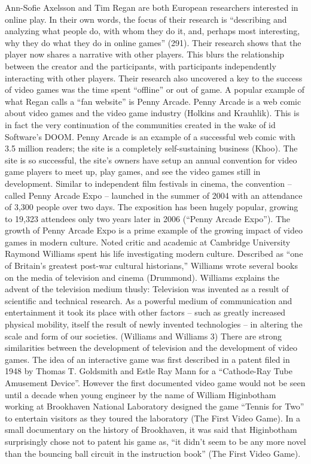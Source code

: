 Ann-Sofie Axelsson and Tim Regan are both European researchers interested in online play. In their own words, the focus of their research is “describing and analyzing what people do, with whom they do it, and, perhaps most interesting, why they do what they do in online games” (291).  Their research shows that the player now shares a narrative with other players. This blurs the relationship between the creator and the participants, with participants independently interacting with other players. Their research also uncovered a key to the success of video games was the time spent “offline” or out of game.  A popular example of what Regan calls a “fan website” is Penny Arcade. 
Penny Arcade is a web comic about video games and the video game industry (Holkins and Krauhlik). This is in fact the very continuation of the communities created in the wake of id Software’s DOOM. Penny Arcade is an example of a successful web comic with 3.5 million readers; the site is a completely self-sustaining business (Khoo). The site is so successful, the site’s owners have setup an annual convention for video game players to meet up, play games, and see the video games still in development. Similar to independent film festivals in cinema, the convention – called Penny Arcade Expo – launched in the summer of 2004 with an attendance of 3,300 people over two days. The exposition has been hugely popular, growing to 19,323 attendees only two years later in 2006 (“Penny Arcade Expo”).  The growth of Penny Arcade Expo is a prime example of the growing impact of video games in modern culture. 
Noted critic and academic at Cambridge University Raymond Williams spent his life investigating modern culture. Described as “one of Britain's greatest post-war cultural historians,” Williams wrote several books on the media of television and cinema (Drummond).  Williams explains the advent of the television medium thusly: 
Television was invented as a result of scientific and technical research. As a powerful medium of communication and entertainment it took its place with other factors – such as greatly increased physical mobility, itself the result of newly invented technologies – in altering the scale and form of our societies. (Williams and Williams 3)
There are strong similarities between the development of television and the development of video games.  The idea of an interactive game was first described in a patent filed in 1948 by Thomas T. Goldsmith and Estle Ray Mann for a “Cathode-Ray Tube Amusement Device”. However the first documented video game would not be seen until a decade when young engineer by the name of William Higinbotham working at Brookhaven National Laboratory designed the game “Tennis for Two” to entertain visitors as they toured the laboratory (The First Video Game). In a small documentary on the history of Brookhaven, it was said that Higinbotham surprisingly chose not to patent his game as, “it didn't seem to be any more novel than the bouncing ball circuit in the instruction book” (The First Video Game).
